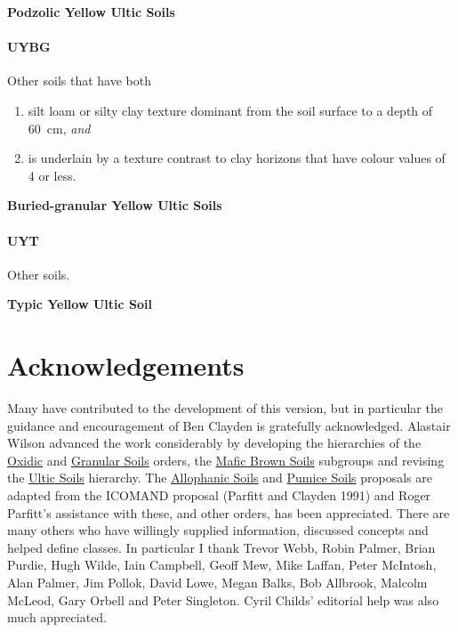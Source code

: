 \documentclass[
  letterpaper,
  DIV=11,
  numbers=noendperiod]{scrreprt}
\providecommand{\tightlist}{%
  \setlength{\itemsep}{0pt}\setlength{\parskip}{0pt}}\usepackage{longtable,booktabs,array}
\begin{document}
\textbf{Podzolic Yellow Ultic Soils}

\hypertarget{sec-key-UYBG}{%
\subsubsection{\texorpdfstring{\textbf{UYBG}}{UYBG}}\label{sec-key-UYBG}}

Other soils that have both

\begin{enumerate}
\def\labelenumi{\arabic{enumi}.}
\tightlist
\item
  silt loam or silty clay texture dominant from the soil surface to a
  depth of 60~cm, \emph{and}
\item
  is underlain by a texture contrast to clay horizons that have colour
  values of 4 or less.
\end{enumerate}

\textbf{Buried-granular Yellow Ultic Soils}

\hypertarget{sec-key-UYT}{%
\subsubsection{\texorpdfstring{\textbf{UYT}}{UYT}}\label{sec-key-UYT}}

Other soils.

\textbf{Typic Yellow Ultic Soil}


\hypertarget{sec-ack}{%
\chapter{Acknowledgements}\label{sec-ack}}

Many have contributed to the development of this version, but in
particular the guidance and encouragement of Ben Clayden is gratefully
acknowledged. Alastair Wilson advanced the work considerably by
developing the hierarchies of the \protect\hyperlink{sec-O}{Oxidic} and
\protect\hyperlink{sec-N}{Granular Soils} orders, the
\protect\hyperlink{sec-BM}{Mafic Brown Soils} subgroups and revising the
\protect\hyperlink{sec-U}{Ultic Soils} hierarchy. The
\protect\hyperlink{sec-L}{Allophanic Soils} and
\protect\hyperlink{sec-M}{Pumice Soils} proposals are adapted from the
ICOMAND proposal (Parfitt and Clayden 1991) and Roger Parfitt's
assistance with these, and other orders, has been appreciated. There are
many others who have willingly supplied information, discussed concepts
and helped define classes. In particular I thank Trevor Webb, Robin
Palmer, Brian Purdie, Hugh Wilde, Iain Campbell, Geoff Mew, Mike Laffan,
Peter McIntosh, Alan Palmer, Jim Pollok, David Lowe, Megan Balks, Bob
Allbrook, Malcolm McLeod, Gary Orbell and Peter Singleton. Cyril Childs'
editorial help was also much appreciated.
\end{document}
